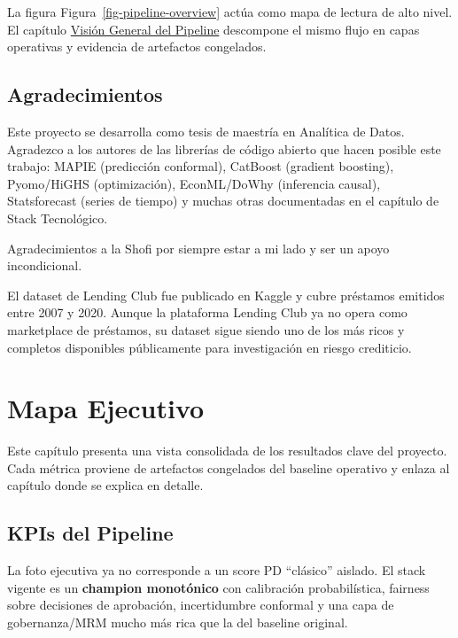 \documentclass[
  spanish,
  11pt,
  letterpaper,
]{scrbook}
\theoremstyle{plain}
\theoremstyle{remark}
\begin{document}
La figura Figura~\ref{fig-pipeline-overview} actúa como mapa de lectura
de alto nivel. El capítulo \href{04-pipeline-overview/index.qmd}{Visión
General del Pipeline} descompone el mismo flujo en capas operativas y
evidencia de artefactos congelados.

\section{Agradecimientos}\label{agradecimientos}

Este proyecto se desarrolla como tesis de maestría en Analítica de
Datos. Agradezco a los autores de las librerías de código abierto que
hacen posible este trabajo: MAPIE (predicción conformal), CatBoost
(gradient boosting), Pyomo/HiGHS (optimización), EconML/DoWhy
(inferencia causal), Statsforecast (series de tiempo) y muchas otras
documentadas en el capítulo de Stack Tecnológico.

Agradecimientos a la Shofi por siempre estar a mi lado y ser un apoyo
incondicional.

El dataset de Lending Club fue publicado en Kaggle y cubre préstamos
emitidos entre 2007 y 2020. Aunque la plataforma Lending Club ya no
opera como marketplace de préstamos, su dataset sigue siendo uno de los
más ricos y completos disponibles públicamente para investigación en
riesgo crediticio.

\chapter{Mapa Ejecutivo}\label{mapa-ejecutivo}

Este capítulo presenta una vista consolidada de los resultados clave del
proyecto. Cada métrica proviene de artefactos congelados del baseline
operativo y enlaza al capítulo donde se explica en detalle.

\section{KPIs del Pipeline}\label{kpis-del-pipeline}

La foto ejecutiva ya no corresponde a un score PD ``clásico'' aislado.
El stack vigente es un \textbf{champion monotónico} con calibración
probabilística, fairness sobre decisiones de aprobación, incertidumbre
conformal y una capa de gobernanza/MRM mucho más rica que la del
baseline original.
\end{document}
